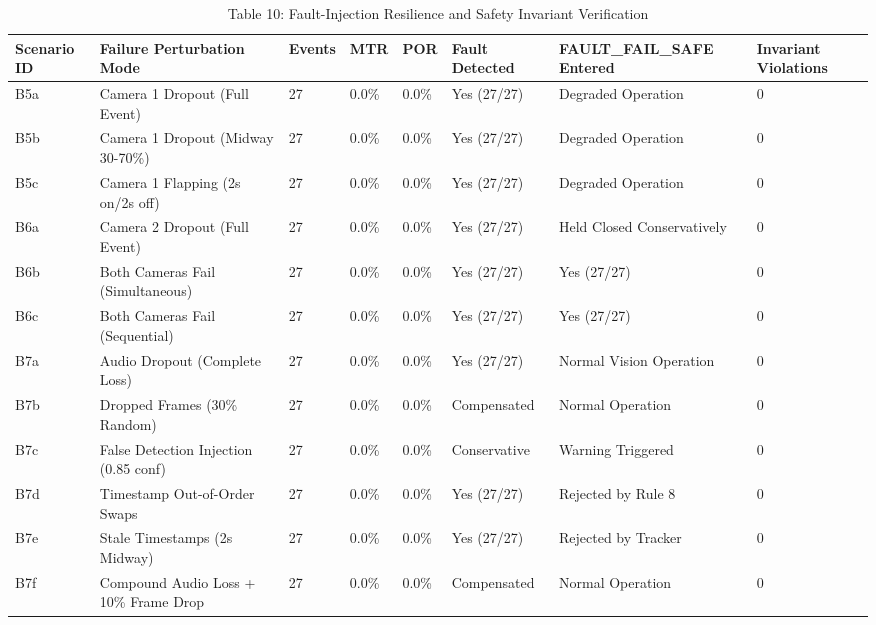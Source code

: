 \begin{table}[t]
\centering
\caption{Table 10: Fault-Injection Resilience and Safety Invariant Verification}
\label{tab:table10_failure_injection_results}
\begin{tabular}{llllllll}
\hline
Scenario ID & Failure Perturbation Mode & Events & MTR & POR & Fault Detected & FAULT\_FAIL\_SAFE Entered & Invariant Violations \\
\hline
B5a & Camera 1 Dropout (Full Event) & 27 & 0.0\% & 0.0\% & Yes (27/27) & Degraded Operation & 0 \\
B5b & Camera 1 Dropout (Midway 30-70\%) & 27 & 0.0\% & 0.0\% & Yes (27/27) & Degraded Operation & 0 \\
B5c & Camera 1 Flapping (2s on/2s off) & 27 & 0.0\% & 0.0\% & Yes (27/27) & Degraded Operation & 0 \\
B6a & Camera 2 Dropout (Full Event) & 27 & 0.0\% & 0.0\% & Yes (27/27) & Held Closed Conservatively & 0 \\
B6b & Both Cameras Fail (Simultaneous) & 27 & 0.0\% & 0.0\% & Yes (27/27) & Yes (27/27) & 0 \\
B6c & Both Cameras Fail (Sequential) & 27 & 0.0\% & 0.0\% & Yes (27/27) & Yes (27/27) & 0 \\
B7a & Audio Dropout (Complete Loss) & 27 & 0.0\% & 0.0\% & Yes (27/27) & Normal Vision Operation & 0 \\
B7b & Dropped Frames (30\% Random) & 27 & 0.0\% & 0.0\% & Compensated & Normal Operation & 0 \\
B7c & False Detection Injection (0.85 conf) & 27 & 0.0\% & 0.0\% & Conservative & Warning Triggered & 0 \\
B7d & Timestamp Out-of-Order Swaps & 27 & 0.0\% & 0.0\% & Yes (27/27) & Rejected by Rule 8 & 0 \\
B7e & Stale Timestamps (2s Midway) & 27 & 0.0\% & 0.0\% & Yes (27/27) & Rejected by Tracker & 0 \\
B7f & Compound Audio Loss + 10\% Frame Drop & 27 & 0.0\% & 0.0\% & Compensated & Normal Operation & 0 \\
\hline
\end{tabular}
\end{table}
